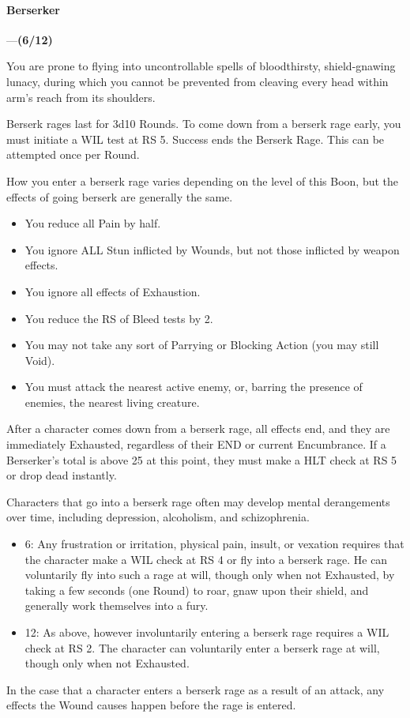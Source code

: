 \documentclass[oneside,11pt,english]{book}
\begin{document}
\paragraph{\label{boon:Berserker}Berserker}---\quad \textbf{(6/12)}\par
You are prone to flying into uncontrollable spells of bloodthirsty, shield-gnawing lunacy, during which 
you cannot be prevented from cleaving every head within arm's reach from its shoulders. 

Berserk rages last for 3d10 Rounds. To come down from a berserk rage early, you must initiate a WIL 
test at RS 5. Success ends the Berserk Rage. This can be attempted once per Round. 

How you enter a berserk rage varies depending on the level of this Boon, but the effects of going berserk are generally the same. 
\begin{itemize}
\item You reduce all Pain by half. 
\item You ignore ALL Stun inflicted by Wounds, but not those inflicted by weapon effects. 
\item You ignore all effects of Exhaustion. 
\item You reduce the RS of Bleed tests by 2. 
\item You may not take any sort of Parrying or Blocking Action (you may still Void). 
\item You must attack the nearest active enemy, or, barring the presence of enemies, the nearest living 
  creature. 
\end{itemize}
After a character comes down from a berserk rage, all effects end, and they are immediately Exhausted, 
regardless of their END or current Encumbrance. If a Berserker's  total is above 25 at this 
point, they must make a HLT check at RS 5 or drop dead instantly. 


Characters that go into a berserk rage often may develop mental derangements over time, including 
depression, alcoholism, and schizophrenia. 
\begin{itemize}
\item 6: Any frustration or irritation, physical pain, insult, or vexation
  requires that the character make a WIL check at RS 4 or fly into a berserk
  rage. He can voluntarily fly into such a rage at will, though only when not
  Exhausted, by taking a few seconds (one Round) to roar, gnaw upon their
  shield, and generally work themselves into a fury.
\item 12: As above, however involuntarily entering a berserk rage requires a WIL
  check at RS 2. The character can voluntarily enter a berserk rage at will,
  though only when not Exhausted. 
\end{itemize}
In the case that a character enters a berserk rage as a result of an attack, any effects the Wound causes happen before the rage is entered.
\end{document}
